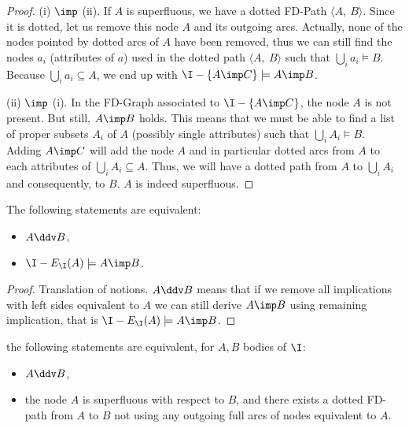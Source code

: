 \begin{proof} (i) $\imp$ (ii). If $A$ is superfluous, we have a dotted FD-Path
$\langle A, \ B \rangle$. Since it is dotted, let us remove this node $A$ and
its outgoing arcs. Actually, none of the nodes pointed by dotted arcs of $A$
have been removed, thus we can still find the nodes $a_i$ (attributes of $a$) 
used in the dotted path $\langle A, \ B \rangle$ such that $\bigcup_i a_i 
\models B$. Because $\bigcup_i a_i \subseteq A$, we end up with $\I - \{A \imp 
C \} \models A \imp B$.

\vspace{1.2em}

(ii) $\imp$ (i). In the FD-Graph associated to $\I - \{A \imp C \}$, the node 
$A$ is not present. But still, $A \imp B$ holds. This means that we must be
able to find a list of proper subsets $A_i$ of $A$ (possibly single attributes)
such that $\bigcup_{i} A_i \models B$. Adding $A \imp C$ will add the node $A$
and in particular dotted arcs from $A$ to each attributes of $\bigcup_{i} A_i 
\subseteq A$. Thus, we will have a dotted path from $A$ to $\bigcup_{i} A_i$ and
consequently, to $B$. $A$ is indeed superfluous.
\end{proof}

\begin{proposition} \label{prop:maier.equiv_dd_sub} The following statements 
are equivalent:
\begin{itemize}
	\item[(i)] $A\ddv B$,
	\item[(ii)] $\I - E_{\I}(A) \models A \imp B$.
\end{itemize}
	
\end{proposition}

\begin{proof}
Translation of notions. $A \ddv B$ means that if we remove all implications
with left sides equivalent to $A$ we can still derive $A \imp B$ using remaining
implication, that is $\I - E_{\I}(A) \models A \imp B$.
\end{proof}

\begin{proposition} \label{prop:maier.equiv_ssup_dd}
the following statements are equivalent, for $A, B$ bodies of $\I$:
\begin{itemize}
	\item[(i)] $A \ddv B$,
	\item[(ii)] the node $A$ is superfluous with respect to $B$, and there 
	exists 
	a dotted FD-path from $A$ to $B$ not using any outgoing full arcs of
	nodes equivalent to $A$.
\end{itemize}
	
\end{proposition}


